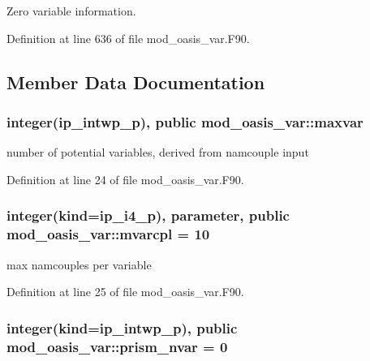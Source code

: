 Zero variable information. 



Definition at line 636 of file mod\+\_\+oasis\+\_\+var.\+F90.



\subsection{Member Data Documentation}
\hypertarget{classmod__oasis__var_a151c4be67882fc8d02f66e4a1822b692}{
\subsubsection[{maxvar}]{\setlength{\rightskip}{0pt plus 5cm}integer(ip\+\_\+intwp\+\_\+p), public mod\+\_\+oasis\+\_\+var\+::maxvar}}\label{classmod__oasis__var_a151c4be67882fc8d02f66e4a1822b692}


number of potential variables, derived from namcouple input 



Definition at line 24 of file mod\+\_\+oasis\+\_\+var.\+F90.

\hypertarget{classmod__oasis__var_a687d6dce16699f36ae3a67accfdba3a9}{
\subsubsection[{mvarcpl}]{\setlength{\rightskip}{0pt plus 5cm}integer(kind=ip\+\_\+i4\+\_\+p), parameter, public mod\+\_\+oasis\+\_\+var\+::mvarcpl = 10}}\label{classmod__oasis__var_a687d6dce16699f36ae3a67accfdba3a9}


max namcouples per variable 



Definition at line 25 of file mod\+\_\+oasis\+\_\+var.\+F90.

\hypertarget{classmod__oasis__var_a095f8ad84e6afbcbe1744d4a9f924e08}{
\subsubsection[{prism\+\_\+nvar}]{\setlength{\rightskip}{0pt plus 5cm}integer(kind=ip\+\_\+intwp\+\_\+p), public mod\+\_\+oasis\+\_\+var\+::prism\+\_\+nvar = 0}}\label{classmod__oasis__var_a095f8ad84e6afbcbe1744d4a9f924e08}


